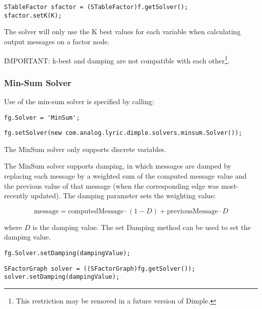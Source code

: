 \ifjava
\begin{lstlisting}
STableFactor sfactor = (STableFactor)f.getSolver();
sfactor.setK(K);
\end{lstlisting}
\fi


The solver will only use the K best values for each variable when calculating output messages on a factor node.

IMPORTANT: k-best and damping are not compatible with each other\footnote{This restriction may be removed in a future version of Dimple.}.


\subsubsection{Min-Sum Solver}

Use of the min-sum solver is specified by calling:

\ifmatlab
\begin{lstlisting}
fg.Solver = 'MinSum';
\end{lstlisting}
\fi

\ifjava
\begin{lstlisting}
fg.setSolver(new com.analog.lyric.dimple.solvers.minsum.Solver());
\end{lstlisting}
\fi

The MinSum solver only supports discrete variables.



The MinSum solver supports damping, in which messages are damped by replacing each message by a weighted sum of the computed message value and the previous value of that message (when the corresponding edge was most-recently updated).  The damping parameter sets the weighting value:

\[
\mathrm{message} = \mathrm{computedMessage} \cdot (1 - D) + \mathrm{previousMessage} \cdot D
\]

where $D$ is the damping value.  The set Damping method can be used to set the damping value.

\ifmatlab
\begin{lstlisting}
fg.Solver.setDamping(dampingValue);
\end{lstlisting}
\fi

\ifjava
\begin{lstlisting}
SFactorGraph solver = ((SFactorGraph)fg.getSolver());
solver.setDamping(dampingValue);
\end{lstlisting}
\fi


